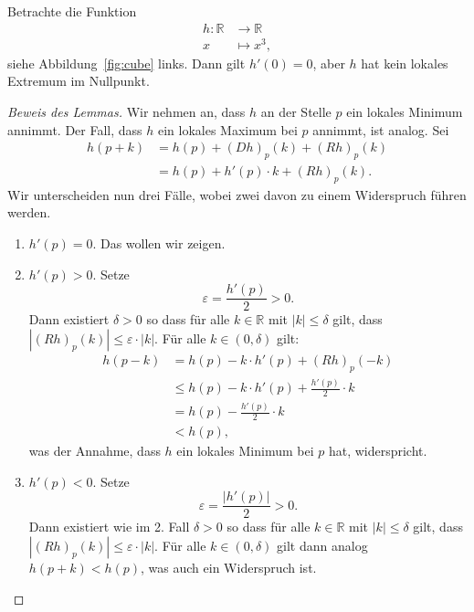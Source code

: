 \documentclass[../main.tex]{subfiles}
\begin{document}
\begin{example}
  Betrachte die Funktion
  \begin{align*}
    h \colon \mathbb{R} & \to \mathbb{R} \\
    x & \mapsto x^3,
  \end{align*}
  siehe Abbildung~\ref{fig:cube} links.
  Dann gilt $h'(0) = 0$, aber $h$
  hat kein lokales Extremum im Nullpunkt.
\end{example}

\begin{proof}[Beweis des Lemmas]
  Wir nehmen an, dass $h$ an der Stelle
  $p$ ein lokales Minimum annimmt. Der Fall,
  dass $h$ ein lokales Maximum bei $p$ annimmt,
  ist analog.
  Sei
  \begin{align*}
    h(p+k)
    & = h(p) + {(Dh)}_p(k) + {(Rh)}_p(k)\\
    & = h(p) + h'(p) \cdot k + {(Rh)}_p(k).
  \end{align*}
  Wir unterscheiden nun drei Fälle,
  wobei zwei davon zu einem Widerspruch führen werden.
  \begin{enumerate}[(1)]
    \item $h'(p) = 0$. Das wollen wir zeigen.
    \item $h'(p) > 0$. Setze
      \[
        \varepsilon = \frac{h'(p)}{2} > 0.
      \]
      Dann existiert $\delta > 0$ so dass
      für alle $k \in \mathbb{R}$ mit
      $|k| \leq \delta$ gilt, dass
      $|{(Rh)}_p(k)| \leq \varepsilon \cdot |k|$.
      Für alle $k \in (0, \delta)$ gilt:
      \begin{align*}
        h(p-k)
        &= h(p) - k \cdot h'(p) + {(Rh)}_p(-k)\\
        &\leq h(p) - k \cdot h'(p) + \frac{h'(p)}{2} \cdot k \\
        &= h(p) - \frac{h'(p)}{2} \cdot k \\
        &< h(p),
      \end{align*}
      was der Annahme, dass $h$ ein lokales Minimum bei $p$
      hat, widerspricht.
    \item $h'(p) < 0$.
      Setze
      \[
        \varepsilon = \frac{|h'(p)|}{2} > 0.
      \]
      Dann existiert wie im 2. Fall $\delta > 0$ so dass
      für alle $k \in \mathbb{R}$ mit
      $|k| \leq \delta$ gilt, dass
      $|{(Rh)}_p(k)| \leq \varepsilon \cdot |k|$.
      Für alle $k \in (0, \delta)$ gilt dann
      analog
      $h(p + k) < h(p)$, was auch ein Widerspruch ist. \qedhere
  \end{enumerate}
\end{proof}
\end{document}
